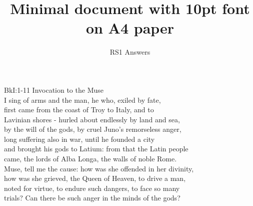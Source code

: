 \documentclass[10pt, a5paper, titlepage]{minimal}
\title{Minimal document with 10pt font on A4 paper}
\author{RS1 Answers}
\date{}
\begin{document}
{BkI:1-11 Invocation to the Muse}\\
I sing of arms and the man, he who, exiled by fate,\\
first came from the coast of Troy to Italy, and to\\
Lavinian shores - hurled about endlessly by land and sea,\\
by the will of the gods, by cruel Juno's remorseless anger,\\
long suffering also in war, until he founded a city\\
and brought his gods to Latium: from that the Latin people\\
came, the lords of Alba Longa, the walls of noble Rome.\\
Muse, tell me the cause: how was she offended in her divinity,\\
how was she grieved, the Queen of Heaven, to drive a man,\\
noted for virtue, to endure such dangers, to face so many\\
trials? Can there be such anger in the minds of the gods?
\end{document}
